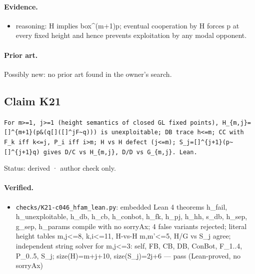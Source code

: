 \documentclass{article}
\begin{document}
\paragraph{Evidence.}
\begin{itemize}
\item reasoning: H implies box\textasciicircum{}(m+1)p; eventual cooperation by H forces p at every fixed height and hence prevents exploitation by any modal opponent.
\end{itemize}

\paragraph{Prior art.} Possibly new: no prior art found in the owner's search.

\subsection*{Claim K21}

\texttt{For m\textgreater{}=1, j\textgreater{}=1 (height semantics of closed GL fixed points), H\_\{m,j\}=[]\textasciicircum{}\{m+1\}(p\&(q\textbar{}[]([]\textasciicircum{}jF\textbar{}\textasciitilde{}q))) is unexploitable; DB trace h\textless{}=m; CC with F\_k iff k\textless{}=j, P\_i iff i\textgreater{}m; H vs H defect (j\textless{}=m); S\_j=[]\textasciicircum{}\{j+1\}(p\textbar{}\textasciitilde{}[]\textasciicircum{}\{j+1\}q) gives D/C vs H\_\{m,j\}, D/D vs G\_\{m,j\}. Lean.}

Status: derived · author check only.

\paragraph{Verified.}
\begin{itemize}
\item \texttt{checks/K21-c046\_hfam\_lean.py}: embedded Lean 4 theorems h\_fail, h\_unexploitable, h\_db, h\_cb, h\_conbot, h\_fk, h\_pj, h\_hh, s\_db, h\_sep, g\_sep, h\_params compile with no sorryAx; 4 false variants rejected; literal height tables m,j\textless{}=8, k,i\textless{}=11, H-vs-H m,m'\textless{}=5, H/G vs S\_j agree; independent string solver for m,j\textless{}=3: self, FB, CB, DB, ConBot, F\_1..4, P\_0..5, S\_j; size(H)=m+j+10, size(S\_j)=2j+6 --- pass (Lean-proved, no sorryAx)
\end{itemize}
\end{document}
